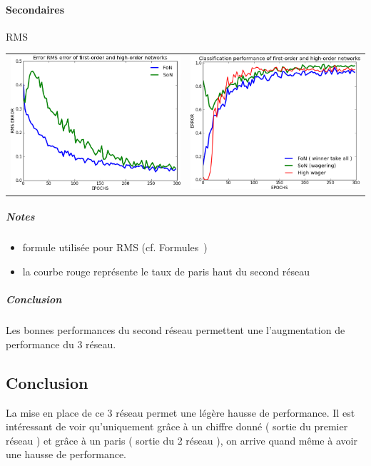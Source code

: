     \paragraph{Secondaires}
      RMS
      \begin{center}
	\begin{tabular}{lr}
	  \hspace*{-1cm}
	  \includegraphics[width=250px]{data/expF1/rms.png}
	  &
	  \includegraphics[width=250px]{data/expF1/perf.png}
	\end{tabular}
      \end{center} 
      \subparagraph{Notes}
	\begin{itemize}
	  \item formule utilisée pour RMS (cf. Formules~)
	  \item la courbe rouge représente le taux de paris haut du second réseau
	\end{itemize}
      \subparagraph{Conclusion}
	Les bonnes performances du second réseau permettent une l'augmentation de performance du 3 réseau.


  \subsection{Conclusion}
  La mise en place de ce 3 réseau permet une légère hausse de performance. Il est intéressant de voir qu'uniquement
  grâce à un chiffre donné ( sortie du premier réseau ) et grâce à un paris ( sortie du 2 réseau ), on arrive 
  quand même à avoir une hausse de performance.
  
